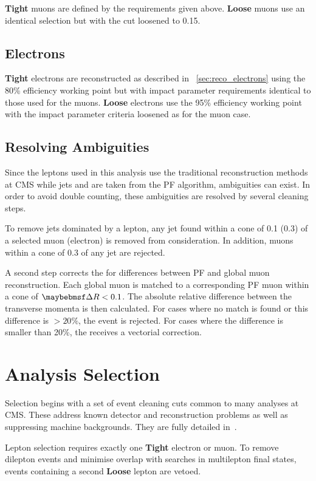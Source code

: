 \textbf{Tight} muons are defined by the requirements given above. \textbf{Loose}
muons use an identical selection but with the \CombIso cut loosened to 0.15.

\subsection{Electrons}
\textbf{Tight} electrons are reconstructed as described in
\sec~\ref{sec:reco_electrons} using the 80\% efficiency working point but
with impact parameter requirements identical to those used for the
muons. \textbf{Loose} electrons use the 95\% efficiency working point with the
impact parameter criteria loosened as for the muon case.

\subsection{Resolving Ambiguities}
Since the leptons used in this analysis use the traditional reconstruction
methods at \ac{CMS} while jets and \METv are taken from the \ac{PF} algorithm,
ambiguities can exist. In order to avoid double counting, these ambiguities are
resolved by several cleaning steps.

To remove jets dominated by a lepton, any jet found within a cone of 0.1 (0.3)
of a selected muon (electron) is removed from consideration. In addition, muons
within a cone of 0.3 of any jet are rejected.

A second step corrects the \METv for differences between \ac{PF} and global muon
reconstruction. Each global muon is matched to a corresponding \ac{PF} muon
within a cone of $\DeltaR < 0.1$. The absolute relative difference between the
transverse momenta is then calculated. For cases where no match is found or this
difference is $> 20\%$, the event is rejected. For cases where the difference is
smaller than 20\%, the \METv receives a vectorial correction.

\section{Analysis Selection}
Selection begins with a set of event cleaning cuts common to many analyses at
\ac{CMS}. These address known detector and reconstruction problems as well as
suppressing machine backgrounds. They are fully detailed
in~\cite{susy_selection_an}.

Lepton selection requires exactly one \textbf{Tight} electron or muon. To remove
dilepton events and minimise overlap with searches in multilepton final states,
events containing a second \textbf{Loose} lepton are vetoed.


